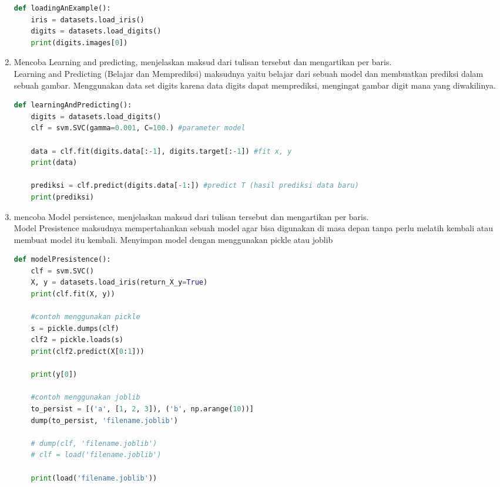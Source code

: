 \begin{enumerate}
\begin{lstlisting}[language=Python]
def loadingAnExample():
    iris = datasets.load_iris()
    digits = datasets.load_digits()
    print(digits.images[0])
\end{lstlisting}

\item
Mencoba Learning and predicting, menjelaskan maksud dari tulisan tersebut dan mengartikan per baris.\\

Learning and Predicting (Belajar dan Memprediksi) maksudnya yaitu belajar dari sebuah model dan membuatkan prediksi dalam sebuah gambar. Menggunakan data set digits karena data digits dapat memprediksi, mengingat gambar digit mana yang diwakilinya. \\

\begin{lstlisting}[language=Python]
def learningAndPredicting():
    digits = datasets.load_digits()
    clf = svm.SVC(gamma=0.001, C=100.) #parameter model

    data = clf.fit(digits.data[:-1], digits.target[:-1]) #fit x, y
    print(data)

    prediksi = clf.predict(digits.data[-1:]) #predict T (hasil prediksi data baru)
    print(prediksi)
\end{lstlisting}

\item
mencoba Model persistence, menjelaskan maksud dari tulisan tersebut dan mengartikan per baris.\\
Model Presistence maksudnya mempertahankan sebuah model agar bisa digunakan di masa depan tanpa perlu melatih kembali atau membuat model itu kembali. Menyimpan model dengan menggunakan pickle atau joblib

\begin{lstlisting}[language=Python]
def modelPresistence():
    clf = svm.SVC()
    X, y = datasets.load_iris(return_X_y=True)
    print(clf.fit(X, y))

    #contoh menggunakan pickle
    s = pickle.dumps(clf)
    clf2 = pickle.loads(s)
    print(clf2.predict(X[0:1]))

    print(y[0])

    #contoh menggunakan joblib
    to_persist = [('a', [1, 2, 3]), ('b', np.arange(10))]
    dump(to_persist, 'filename.joblib')

    # dump(clf, 'filename.joblib')
    # clf = load('filename.joblib')

    print(load('filename.joblib'))
\end{lstlisting}


\end{enumerate}
